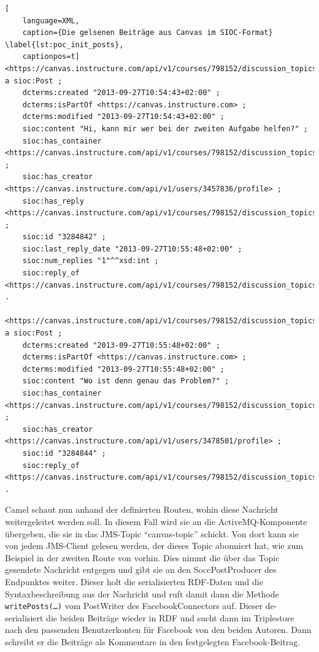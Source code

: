 \begin{lstlisting}[
    language=XML,
    caption={Die gelsenen Beiträge aus Canvas im SIOC-Format} \label{lst:poc_init_posts},
    captionpos=t]
<https://canvas.instructure.com/api/v1/courses/798152/discussion_topics/1540697/entries/3284842> a sioc:Post ;
    dcterms:created "2013-09-27T10:54:43+02:00" ;
    dcterms:isPartOf <https://canvas.instructure.com> ;
    dcterms:modified "2013-09-27T10:54:43+02:00" ;
    sioc:content "Hi, kann mir wer bei der zweiten Aufgabe helfen?" ;
    sioc:has_container <https://canvas.instructure.com/api/v1/courses/798152/discussion_topics/1540697> ;
    sioc:has_creator <https://canvas.instructure.com/api/v1/users/3457836/profile> ;
    sioc:has_reply <https://canvas.instructure.com/api/v1/courses/798152/discussion_topics/1540697/entries/3284844> ;
    sioc:id "3284842" ;
    sioc:last_reply_date "2013-09-27T10:55:48+02:00" ;
    sioc:num_replies "1"^^xsd:int ;
    sioc:reply_of <https://canvas.instructure.com/api/v1/courses/798152/discussion_topics/1540697#discussion_topic> .

<https://canvas.instructure.com/api/v1/courses/798152/discussion_topics/1540697/entries/3284844> a sioc:Post ;
    dcterms:created "2013-09-27T10:55:48+02:00" ;
    dcterms:isPartOf <https://canvas.instructure.com> ;
    dcterms:modified "2013-09-27T10:55:48+02:00" ;
    sioc:content "Wo ist denn genau das Problem?" ;
    sioc:has_container <https://canvas.instructure.com/api/v1/courses/798152/discussion_topics/1540697> ;
    sioc:has_creator <https://canvas.instructure.com/api/v1/users/3478501/profile> ;
    sioc:id "3284844" ;
    sioc:reply_of <https://canvas.instructure.com/api/v1/courses/798152/discussion_topics/1540697/entries/3284842> .
\end{lstlisting}

Camel schaut nun anhand der definierten Routen, wohin diese Nachricht weitergeleitet werden soll. In diesem Fall wird sie an die ActiveMQ-Komponente übergeben, die sie in das JMS-Topic \enquote{canvas-topic} schickt. Von dort kann sie von jedem JMS-Client gelesen werden, der dieses Topic abonniert hat, wie zum Beispiel in der zweiten Route von vorhin. Dies nimmt die über das Topic gesendete Nachricht entgegen und gibt sie an den SoccPostProducer des Endpunktes weiter. Dieser holt die serialisierten RDF-Daten und die Syntaxbeschreibung aus der Nachricht und ruft damit dann die Methode \texttt{writePosts(\dots)} vom PostWriter des FacebookConnectors auf. Dieser de-serialisiert die beiden Beiträge wieder in RDF und sucht dann im Triplestore nach den passenden Benutzerkonten für Facebook von den beiden Autoren. Dann schreibt er die Beiträge als Kommentare in den festgelegten Facebook-Beitrag.

